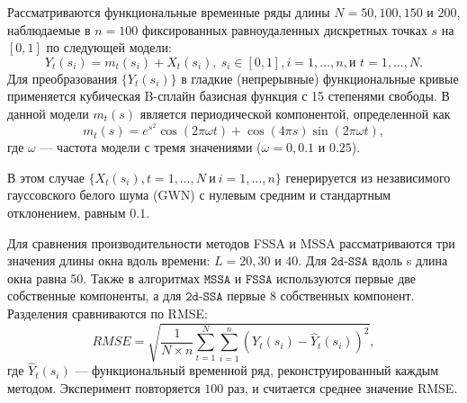 \documentclass[12pt, specialist, subf
]{disser}
\theoremstyle{definition}
\newcommand{\MSSA}{\texttt{MSSA}}
\newcommand{\FSSA}{\texttt{FSSA}}
\newcommand{\DSSA}{\texttt{2d-SSA}}
\begin{document}
Рассматриваются функциональные временные ряды длины $N=50, 100, 150$ и $200$, наблюдаемые в $n=100$ фиксированных равноудаленных дискретных точках $s$ на $[0,1]$ по следующей модели:
\begin{equation}\label{eq:mainmodel}
	Y_t\left(s_i\right)=m_t(s_i)+X_t\left(s_i\right),\ s_i \in [0,1], i=1,\ldots,n, \text{и } t=1, \dots, N.
\end{equation}
Для преобразования $\{Y_t(s_i)\}$ в гладкие (непрерывные) функциональные кривые применяется кубическая B-сплайн базисная функция с 15 степенями свободы. В данной модели $m_t(s)$ является периодической компонентой, определенной как
\begin{equation}\label{eq:Trend}
	m_t(s)=e^{s^2} \cos\left(2\pi \omega t\right)+\cos(4\pi s) \sin\left(2\pi \omega t\right),
\end{equation}
где $\omega$ — частота модели с тремя значениями ($\omega=0, 0.1$ и $0.25$).

В этом случае $\{X_t(s_i), t=1,\ldots, N\ \text{и}\ i=1,\ldots,n \}$ генерируется из независимого гауссовского белого шума (GWN) с нулевым средним и стандартным отклонением, равным $0.1$.

Для сравнения производительности методов FSSA и MSSA рассматриваются три значения длины окна вдоль времени: $L=20, 30$ и $40$. Для $\DSSA$ вдоль s длина окна равна 50. Также в алгоритмах $\MSSA$ и $\FSSA$ используются первые две собственные компоненты, а для $\DSSA$ первые 8 собственных компонент. Разделения сравниваются по RMSE:
\[RMSE= \sqrt {\frac{1}{N\times n}\sum\limits_{t=1}^N \sum_{i=1}^n \left(Y_t(s_i)-\hat{Y}_t(s_i)\right)^2},\]
где $\hat{Y}_t(s_i)$ — функциональный временной ряд, реконструированный каждым методом. Эксперимент повторяется $100$ раз, и считается среднее значение RMSE.
\end{document}
